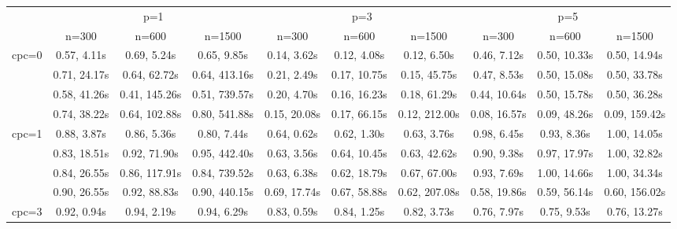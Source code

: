 \documentclass[article]{jss}\usepackage[]{graphicx}\usepackage[]{xcolor}
\begin{document}
\begin{landscape}

  \begin{table}[t!]
    \centering
    \begin{tabular}{@{}cccccccccc@{}}
    \toprule
                           & \multicolumn{3}{c}{p=1}                                            & \multicolumn{3}{c}{p=3}                                            & \multicolumn{3}{c}{p=5}                                            \\
                           & n=300                & n=600                & n=1500               & n=300                & n=600                & n=1500               & n=300                & n=600                & n=1500               \\ \midrule
    \multirow{4}{*}{cpc=0} & 0.57, 4.11s & 0.69, 5.24s & 0.65, 9.85s & 0.14, 3.62s & 0.12, 4.08s & 0.12, 6.50s & 0.46, 7.12s & 0.50, 10.33s & 0.50, 14.94s \\
                           & 0.71, 24.17s & 0.64, 62.72s & 0.64, 413.16s & 0.21, 2.49s & 0.17, 10.75s & 0.15, 45.75s & 0.47, 8.53s & 0.50, 15.08s & 0.50, 33.78s \\
                           & 0.58, 41.26s & 0.41, 145.26s & 0.51, 739.57s & 0.20, 4.70s & 0.16, 16.23s & 0.18, 61.29s & 0.44, 10.64s & 0.50, 15.78s & 0.50, 36.28s \\
                           & 0.74, 38.22s & 0.64, 102.88s & 0.80, 541.88s & 0.15, 20.08s & 0.17, 66.15s & 0.12, 212.00s & 0.08, 16.57s & 0.09, 48.26s & 0.09, 159.42s \\ \midrule
    \multirow{4}{*}{cpc=1} & 0.88, 3.87s & 0.86, 5.36s & 0.80, 7.44s & 0.64, 0.62s & 0.62, 1.30s & 0.63, 3.76s & 0.98, 6.45s & 0.93, 8.36s & 1.00, 14.05s \\
                           & 0.83, 18.51s & 0.92, 71.90s & 0.95, 442.40s & 0.63, 3.56s & 0.64, 10.45s & 0.63, 42.62s & 0.90, 9.38s & 0.97, 17.97s & 1.00, 32.82s \\
                           & 0.84, 26.55s & 0.86, 117.91s & 0.84, 739.52s & 0.63, 6.38s & 0.62, 18.79s & 0.67, 67.00s & 0.93, 7.69s & 1.00, 14.66s & 1.00, 34.34s \\
                           & 0.90, 26.55s & 0.92, 88.83s & 0.90, 440.15s & 0.69, 17.74s & 0.67, 58.88s & 0.62, 207.08s & 0.58, 19.86s & 0.59, 56.14s & 0.60, 156.02s \\ \midrule
    \multirow{4}{*}{cpc=3} & 0.92, 0.94s & 0.94, 2.19s & 0.94, 6.29s & 0.83, 0.59s & 0.84, 1.25s & 0.82, 3.73s & 0.76, 7.97s & 0.75, 9.53s & 0.76, 13.27s \\

\end{tabular}
\end{table}
\end{landscape}
\end{document}
